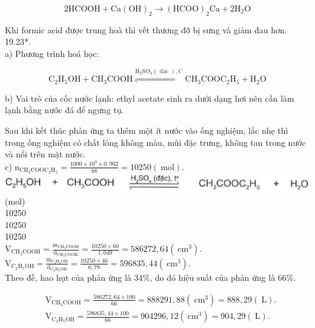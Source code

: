 \documentclass[10pt]{article}
\begin{document}
$$
2 \mathrm{HCOOH}+\mathrm{Ca}(\mathrm{OH})_{2} \rightarrow(\mathrm{HCOO})_{2} \mathrm{Ca}+2 \mathrm{H}_{2} \mathrm{O}
$$

Khi formic acid được trung hoà thì vết thương đỡ bị sưng và giảm đau hơn.\\
19.23*.\\
a) Phương trình hoá học:

$$
\mathrm{C}_{2} \mathrm{H}_{5} \mathrm{OH}+\mathrm{CH}_{3} \mathrm{COOH} \stackrel{\mathrm{H}_{2} \mathrm{SO}_{4}(\text { däc }), \mathrm{t}^{\circ}}{\rightleftharpoons} \mathrm{CH}_{3} \mathrm{COOC}_{2} \mathrm{H}_{5}+\mathrm{H}_{2} \mathrm{O}
$$

b) Vai trò của cốc nước lạnh: ethyl acetate sinh ra dưới dạng hơi nên cần làm lạnh bằng nước đá để ngưng tụ.

Sau khi kết thúc phản ứng ta thêm một ít nước vào ống nghiệm, lắc nhẹ thì trong ống nghiệm có chất lỏng không màu, mùi đặc trưng, không tan trong nước và nổi trên mặt nước.\\
c) $\mathrm{n}_{\mathrm{CH}_{3} \mathrm{COOC}_{2} \mathrm{H}_{5}}=\frac{1000 \times 10^{3} \times 0,902}{88}=10250(\mathrm{~mol})$.\\
\includegraphics[max width=\textwidth, center]{2025_10_23_adad5b98d65ac6665838g-42}\\
(mol)\\
10250\\
10250\\
10250\\
$\mathrm{V}_{\mathrm{CH}_{3} \mathrm{COOH}}=\frac{\mathrm{m}_{\mathrm{CH}_{3} \mathrm{COOH}}}{\mathrm{d}_{\mathrm{CH}_{3} \mathrm{COOH}}}=\frac{10250 \times 60}{1,049}=586272,64\left(\mathrm{~cm}^{3}\right)$.\\
$\mathrm{V}_{\mathrm{C}_{2} \mathrm{H}_{5} \mathrm{OH}}=\frac{\mathrm{m}_{\mathrm{C}_{2} \mathrm{H}_{5} \mathrm{OH}}}{\mathrm{d}_{\mathrm{C}_{2} \mathrm{H}_{5} \mathrm{OH}}}=\frac{10250 \times 46}{0,79}=596835,44\left(\mathrm{~cm}^{3}\right)$.\\
Theo đề, hao hụt của phản ứng là $34 \%$, do đó hiệu suất của phản ứng là $66 \%$.

$$
\begin{aligned}
& \mathrm{V}_{\mathrm{CH}_{3} \mathrm{COOH}}=\frac{586272,64 \times 100}{66}=888291,88\left(\mathrm{~cm}^{3}\right)=888,29(\mathrm{~L}) . \\
& \mathrm{V}_{\mathrm{C}_{2} \mathrm{H}_{5} \mathrm{OH}}=\frac{596835,44 \times 100}{66}=904296,12\left(\mathrm{~cm}^{3}\right)=904,29(\mathrm{~L}) .
\end{aligned}
$$
\end{document}
